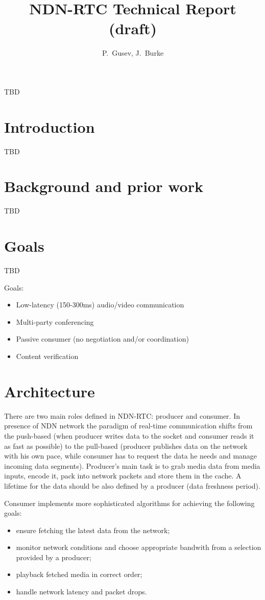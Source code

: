 \documentclass[10pt]{proc}
\author{P.~Gusev, J.~Burke}
\title{NDN-RTC Technical Report (draft)}
\begin{document}
\maketitle

\abstract
TBD

\section{Introduction}
TBD

\section{Background and prior work}
TBD

\section{Goals}
TBD

Goals:

\begin{itemize}
\item Low-latency (150-300ms) audio/video communication
\item Multi-party conferencing
\item Passive consumer (no negotiation and/or coordination)
\item Content verification
\end{itemize}

\section{Architecture}
There are two main roles defined in NDN-RTC: producer and consumer. In presence of NDN network the paradigm of real-time communication shifts from the push-based (when producer writes data to the socket and consumer reads it as fast as possible) to the pull-based (producer publishes data on the network with his own pace, while consumer has to request the data he needs and manage incoming data segments).
Producer's main task is to grab media data from media inputs, encode it, pack into network packets and store them in the cache. A lifetime for the data should be also defined by a producer (data freshness period).

Consumer implements more sophisticated algorithms for achieving the following goals:
\begin{itemize}
\item ensure fetching the latest data from the network; 
\item monitor network conditions and choose appropriate bandwith from a selection provided by a producer;  
\item playback fetched media in correct order;
\item handle network latency and packet drops.
\end{itemize}
\end{document}
